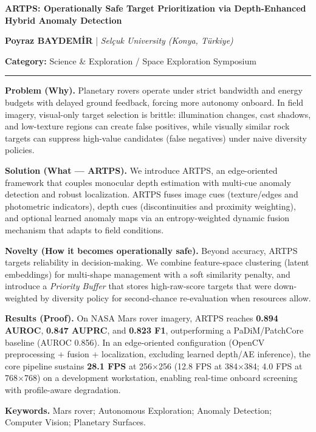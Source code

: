 \documentclass[10pt,a4paper]{article}
\newcommand{\blocktitle}[1]{\textbf{\textcolor{iacBlue}{#1}}}
\begin{document}
{\LARGE \textbf{ARTPS: Operationally Safe Target Prioritization via Depth-Enhanced Hybrid Anomaly Detection}}\par
\vspace{2pt}
{\normalsize \textbf{Poyraz BAYDEMİR} \;\;|\;\; \textit{Selçuk University (Konya, Türkiye)}}\par
{\small \textbf{Category:} Science \& Exploration / Space Exploration Symposium}\par
\vspace{6pt}
\hrule
\vspace{8pt}

\begin{minipage}[t]{0.60\linewidth}
\blocktitle{Problem (Why).}\;
Planetary rovers operate under strict bandwidth and energy budgets with delayed ground feedback, forcing more autonomy onboard. In field imagery, visual-only target selection is brittle: illumination changes, cast shadows, and low-texture regions can create false positives, while visually similar rock targets can suppress high-value candidates (false negatives) under naive diversity policies.

\blocktitle{Solution (What --- ARTPS).}\;
We introduce ARTPS, an edge-oriented framework that couples monocular depth estimation with multi-cue anomaly detection and robust localization. ARTPS fuses image cues (texture/edges and photometric indicators), depth cues (discontinuities and proximity weighting), and optional learned anomaly maps via an entropy-weighted dynamic fusion mechanism that adapts to field conditions.

\blocktitle{Novelty (How it becomes operationally safe).}\;
Beyond accuracy, ARTPS targets reliability in decision-making. We combine feature-space clustering (latent embeddings) for multi-shape management with a soft similarity penalty, and introduce a \emph{Priority Buffer} that stores high-raw-score targets that were down-weighted by diversity policy for second-chance re-evaluation when resources allow.

\blocktitle{Results (Proof).}\;
On NASA Mars rover imagery, ARTPS reaches \textbf{0.894 AUROC}, \textbf{0.847 AUPRC}, and \textbf{0.823 F1}, outperforming a PaDiM/PatchCore baseline (AUROC 0.856). In an edge-oriented configuration (OpenCV preprocessing + fusion + localization, excluding learned depth/AE inference), the core pipeline sustains \textbf{28.1 FPS} at 256\(\times\)256 (12.8 FPS at 384\(\times\)384; 4.0 FPS at 768\(\times\)768) on a development workstation, enabling real-time onboard screening with profile-aware degradation.

\blocktitle{Keywords.}\;
Mars rover; Autonomous Exploration; Anomaly Detection; Computer Vision; Planetary Surfaces.
\end{minipage}\hfill
\end{document}
